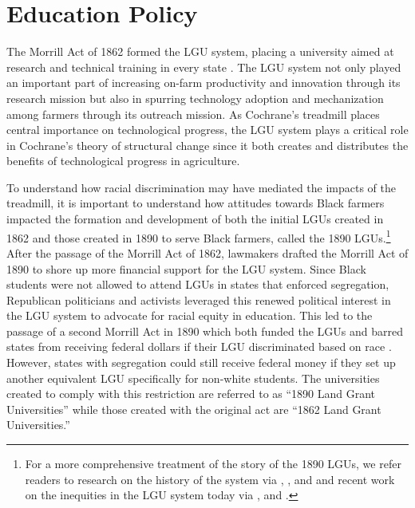 \documentclass[12pt]{article}
\begin{document}
\section*{Education Policy}
The Morrill Act of 1862 formed the LGU system, placing a university aimed at research and technical training in every state \citep{sorber_land-grant_2018}. 
The LGU system not only played an important part of increasing on-farm productivity and innovation through its research mission \citep{andrews_local_2021,kantor_research_2019} but also in spurring technology adoption and mechanization among farmers through its outreach mission.
As Cochrane's treadmill places central importance on technological progress, the LGU system plays a critical role in Cochrane's theory of structural change since it both creates and distributes the benefits of technological progress in agriculture.

To understand how racial discrimination may have mediated the impacts of the treadmill, it is important to understand how attitudes towards Black farmers impacted the formation and development of both the initial LGUs created in 1862 and those created in 1890 to serve Black farmers, called the 1890 LGUs.\footnote{For a more comprehensive treatment of the story of the 1890 LGUs, we refer readers to research on the history of the system via \citet{sorber_land-grant_2018}, \citet{rose_race_2022}, and \citet{sharpe_all_2004} and recent work on the inequities in the LGU system today via \citet{grant_overview_2024}, \citet{wilson_distribution_2024} and \citet{adams_how_2022}.} 
After the passage of the Morrill Act of 1862, lawmakers drafted the Morrill Act of 1890 to shore up more financial support for the LGU system. 
Since Black students were not allowed to attend LGUs in states that enforced segregation, Republican politicians and activists leveraged this renewed political interest in the LGU system to advocate for racial equity in education. 
This led to the passage of a second Morrill Act in 1890 which both funded the LGUs and barred states from receiving federal dollars if their LGU discriminated based on race \citep{rose_race_2022}.
However, states with segregation could still receive federal money if they set up another equivalent LGU specifically for non-white students. 
The universities created to comply with this restriction are referred to as “1890 Land Grant Universities” while those created with the original act are “1862 Land Grant Universities.” 
\end{document}

